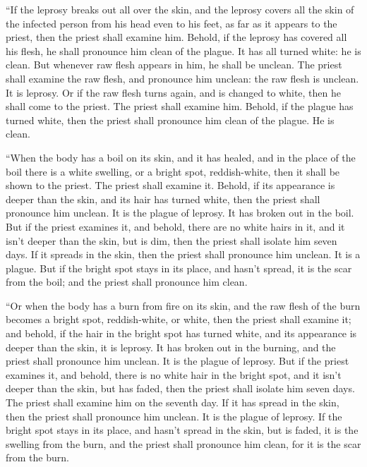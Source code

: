  ``If the leprosy breaks out all over the skin, and the
leprosy covers all the skin of the infected person from his head even to
his feet, as far as it appears to the priest,  then the
priest shall examine him. Behold, if the leprosy has covered all his
flesh, he shall pronounce him clean of the plague. It has all turned
white: he is clean.  But whenever raw flesh appears in him,
he shall be unclean.  The priest shall examine the raw
flesh, and pronounce him unclean: the raw flesh is unclean. It is
leprosy.  Or if the raw flesh turns again, and is changed
to white, then he shall come to the priest.  The priest
shall examine him. Behold, if the plague has turned white, then the
priest shall pronounce him clean of the plague. He is clean.

 ``When the body has a boil on its skin, and it has healed,
 and in the place of the boil there is a white swelling, or
a bright spot, reddish-white, then it shall be shown to the priest.
 The priest shall examine it. Behold, if its appearance is
deeper than the skin, and its hair has turned white, then the priest
shall pronounce him unclean. It is the plague of leprosy. It has broken
out in the boil.  But if the priest examines it, and
behold, there are no white hairs in it, and it isn't deeper than the
skin, but is dim, then the priest shall isolate him seven days.
 If it spreads in the skin, then the priest shall pronounce
him unclean. It is a plague.  But if the bright spot stays
in its place, and hasn't spread, it is the scar from the boil; and the
priest shall pronounce him clean.

 ``Or when the body has a burn from fire on its skin, and
the raw flesh of the burn becomes a bright spot, reddish-white, or
white,  then the priest shall examine it; and behold, if
the hair in the bright spot has turned white, and its appearance is
deeper than the skin, it is leprosy. It has broken out in the burning,
and the priest shall pronounce him unclean. It is the plague of leprosy.
 But if the priest examines it, and behold, there is no
white hair in the bright spot, and it isn't deeper than the skin, but
has faded, then the priest shall isolate him seven days. 
The priest shall examine him on the seventh day. If it has spread in the
skin, then the priest shall pronounce him unclean. It is the plague of
leprosy.  If the bright spot stays in its place, and hasn't
spread in the skin, but is faded, it is the swelling from the burn, and
the priest shall pronounce him clean, for it is the scar from the burn.

